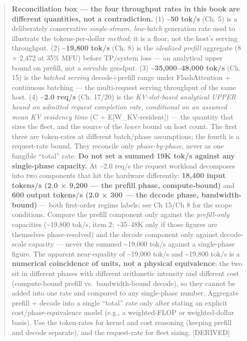 \begin{quote}
\textbf{Reconciliation box --- the four throughput rates in this book
are different quantities, not a contradiction.} (1)
\textbf{\textasciitilde50 tok/s} (Ch. 5) is a deliberately conservative
\emph{single-stream, low-batch} generation rate used to illustrate the
tokens-per-dollar \emph{method}; it is a floor, not the host's serving
throughput. (2) \textbf{\textasciitilde19,800 tok/s} (Ch. 8) is the
\emph{idealized prefill} aggregate (8 × 2,472 at 35\% MFU) before
TP/system loss --- an analytical upper bound on prefill, not a servable
goodput. (3) \textbf{\textasciitilde35,000--48,000 tok/s} (Ch. 15) is
the \emph{batched serving} decode+prefill range under FlashAttention +
continuous batching --- the multi-request serving throughput of the same
host. (4) \textbf{\textasciitilde2.0 req/s} (Ch. 17/20) is the
\emph{KV-slot-based analytical UPPER bound on admitted request
completion rate, conditional on an assumed mean KV residency time} (C ÷
E{[}W\_KV-resident{]}) --- the quantity that sizes the fleet, and the
source of the \emph{lower} bound on host count. The first three are
token-rates at different batch/phase assumptions; the fourth is a
request-rate bound. They reconcile only \emph{phase-by-phase}, never as
one fungible ``total'' rate. \textbf{Do not set a summed 19K tok/s
against any single-phase capacity.} At \textasciitilde2.0 req/s the
request workload decomposes into two components that hit the hardware
differently: \textbf{18,400 input tokens/s (2.0 × 9,200 --- the prefill
phase, compute-bound)} and \textbf{600 output tokens/s (2.0 × 300 ---
the decode phase, bandwidth-bound)} --- both first-order regime labels;
see Ch 15/Ch 8 for the scope conditions. Compare the prefill component
only against the \emph{prefill-only} capacities (\textasciitilde19,800
tok/s, item 2; \textasciitilde35--48K only if those figures are
themselves phase-resolved) and the decode component only against
decode-scale capacity --- never the summed \textasciitilde19,000 tok/s
against a single-phase figure. The apparent near-equality of
\textasciitilde19,000 tok/s and \textasciitilde19,800 tok/s is a
\textbf{numerical coincidence of units, not a physical equivalence}: the
two sit in different phases with different arithmetic intensity and
different cost (compute-bound prefill vs.~bandwidth-bound decode), so
they cannot be added into one rate and compared to any single-phase
number. Aggregate prefill + decode into a single ``total'' rate only
after stating an explicit cost/phase-equivalence model (e.g., a
weighted-FLOP or weighted-dollar basis). Use the token-rates for kernel
and cost reasoning (keeping prefill and decode separate), and the
request-rate for fleet sizing. \mbox{{[}DERIVED{]}}
\end{quote}

